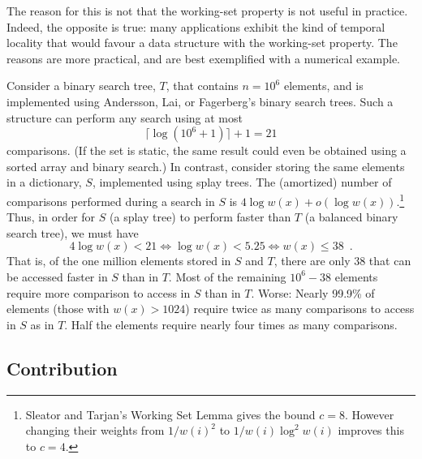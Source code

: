 \documentclass[lotsofwhite]{patmorin}
\begin{document}
The reason for this is not that the working-set property is not useful
in practice.  Indeed, the opposite is true: many applications exhibit
the kind of temporal locality that would favour a data structure with
the working-set property.  The reasons are more practical, and are best
exemplified with a numerical example.

Consider a binary search tree, $T$, that contains $n=10^6$ elements, and
is implemented using Andersson, Lai, or Fagerberg's binary search trees.
Such a structure can perform any search using at most
\[
   \lceil\log(10^6+1)\rceil+1= 21
\]
comparisons. (If the set is static, the same result could even be obtained
using a sorted array and binary search.)  In contrast, consider storing
the same elements in a dictionary, $S$, implemented using splay trees.
The (amortized) number of comparisons performed during a search in $S$
is $4\log w(x)+o(\log w(x))$.\footnote{Sleator and Tarjan's Working
    Set Lemma \cite{X} gives the bound $c=8$.  However changing their
    weights from $1/w(i)^2$ to $1/w(i)\log^2 w(i)$ improves this to
    $c=4$.}  Thus, in order for $S$
(a splay tree)
to perform faster than $T$ (a balanced binary search tree), we must have
\[
   4\log w(x) < 21 
       \Leftrightarrow \log w(x) < 5.25 
       \Leftrightarrow w(x) \le 38 \enspace .
\]
That is, of the one million elements stored in $S$ and $T$, there are
only 38 that can be accessed faster in $S$ than in $T$.  Most of the
remaining $10^6 - 38$ elements require more comparison to access in $S$
than in $T$.  Worse: Nearly 99.9\% of elements (those with $w(x)>1024$)
require twice as many comparisons to access in $S$ as in $T$.  Half the
elements require nearly four times as many comparisons.



\subsection{Contribution}
\end{document}
